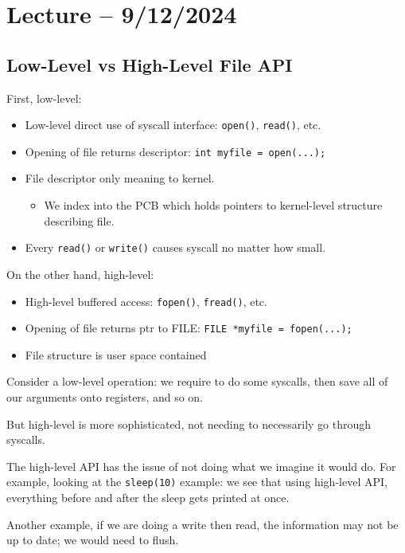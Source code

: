 \documentclass[openany]{book}
\begin{document}
\section{Lecture -- 9/12/2024}
\subsection{Low-Level vs High-Level File API}
First, low-level:
\begin{itemize}
	\item Low-level direct use of syscall interface: \texttt{open()}, \texttt{read()}, etc.
	\item Opening of file returns descriptor: \texttt{int myfile = open(...);}
	\item File descriptor only meaning to kernel.
	\begin{itemize}
		\item We index into the PCB which holds pointers to kernel-level structure describing file.
	\end{itemize}
	\item Every \texttt{read()} or \texttt{write()} causes syscall no matter how small.
\end{itemize}

On the other hand, high-level:
\begin{itemize}
	\item High-level buffered access: \texttt{fopen()}, \texttt{fread()}, etc.
	\item Opening of file returns ptr to FILE: \texttt{FILE *myfile = fopen(...);}
	\item File structure is user space contained
\end{itemize}

Consider a low-level operation: we require to do some syscalls, then save all of our arguments onto registers, and so on.

But high-level is more sophisticated, not needing to necessarily go through syscalls.

The high-level API has the issue of not doing what we imagine it would do. For example, looking at the \texttt{sleep(10)} example: we see that using high-level API, everything before and after the sleep gets printed at once.

Another example, if we are doing a write then read, the information may not be up to date; we would need to flush.

\end{document}
